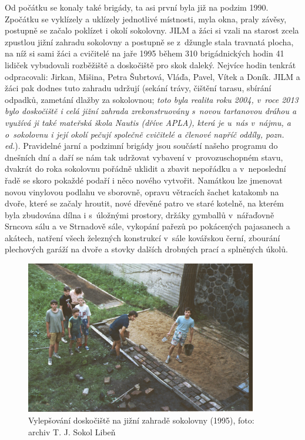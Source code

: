 \documentclass[a5paper, 11pt, twoside]{article}
\newcommand{\pozned}[1]{%
\textit{#1}}
\begin{document}
Od počátku se konaly také brigády, ta asi první byla již na podzim 1990.
Zpočátku se vyklízely a uklízely jednotlivé místnosti, myla okna, praly
závěsy, postupně se začalo poklízet i okolí sokolovny. JILM a žáci si
vzali na starost zcela zpustlou jižní zahradu sokolovny a postupně se
z~džungle stala travnatá plocha, na níž si sami žáci a cvičitelé na jaře
1995 během 310 brigádnických hodin 41 lidiček vybudovali rozběžiště a
doskočiště pro skok daleký. Nejvíce hodin tenkrát odpracovali: Jirkan,
Mišina, Petra Šubrtová, Vláďa, Pavel, Vítek a Doník. JILM a žáci pak
dodnes tuto zahradu udržují (sekání trávy, čištění tarasu, sbírání
odpadků, zametání dlažby za sokolovnou; \pozned{toto byla realita roku
2004, v~roce 2013 bylo doskočiště i celá jižní zahrada zrekonstruovány
s~novou tartanovou dráhou a využívá ji také mateřská škola Nautis (dříve
APLA), která je u~nás v~nájmu, a o~sokolovnu i její okolí pečují
společně cvičitelé a členové napříč oddíly, pozn. ed.}). Pravidelné
jarní a podzimní brigády jsou součástí našeho programu do dnešních dní a
daří se nám tak udržovat vybavení v~provozuschopném stavu, dvakrát do
roka sokolovnu pořádně uklidit a zbavit nepořádku a v~neposlední řadě se
skoro pokaždé podaří i něco nového vytvořit. Namátkou lze jmenovat novou
vinylovou podlahu ve sborovně, opravu větracích šachet katakomb na
dvoře, které se začaly hroutit, nové dřevěné patro ve staré kotelně, na
kterém byla zbudována dílna i s~úložnými prostory, držáky gymballů
v~nářaďovně Srncova sálu a ve Strnadově sále, vykopání pařezů po
pokácených pajasanech a akátech, natření všech železných konstrukcí
v~sále kovářskou černí, zbourání plechových garáží na dvoře a stovky
dalších drobných prací a splněných úkolů.

\begin{figure}[h!]
  \centering 
  \includegraphics[width=0.9\textwidth]{img/40_doskociste.jpg}
  \caption*{Vylepšování doskočiště na jižní zahradě sokolovny (1995), foto: archiv T. J. Sokol Libeň}
\end{figure}
\end{document}
